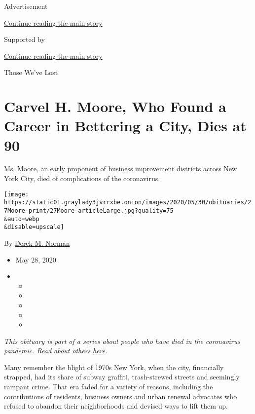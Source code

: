 Advertisement

\protect\hyperlink{after-top}{Continue reading the main story}

Supported by

\protect\hyperlink{after-sponsor}{Continue reading the main story}

Those We've Lost

\hypertarget{carvel-h-moore-who-found-a-career-in-bettering-a-city-dies-at-90}{%
\section{Carvel H. Moore, Who Found a Career in Bettering a City, Dies
at
90}\label{carvel-h-moore-who-found-a-career-in-bettering-a-city-dies-at-90}}

Ms. Moore, an early proponent of business improvement districts across
New York City, died of complications of the coronavirus.

\texttt{[image: https://static01.graylady3jvrrxbe.onion/images/2020/05/30/obituaries/27Moore-print/27Moore-articleLarge.jpg?quality=75\\\&auto=webp\\\&disable=upscale]}

By \href{https://www.nytimes3xbfgragh.onion/by/derek-m-norman}{Derek M.
Norman}

\begin{itemize}
\item
  May 28, 2020
\item
  \begin{itemize}
  \item
  \item
  \item
  \item
  \item
  \end{itemize}
\end{itemize}

\emph{This obituary is part of a series about people who have died in
the coronavirus pandemic. Read about others}
\href{https://www.nytimes3xbfgragh.onion/interactive/2020/obituaries/people-died-coronavirus-obituaries.html}{\emph{here}}\emph{.}

Many remember the blight of 1970s New York, when the city, financially
strapped, had its share of subway graffiti, trash-strewed streets and
seemingly rampant crime. That era faded for a variety of reasons,
including the contributions of residents, business owners and urban
renewal advocates who refused to abandon their neighborhoods and devised
ways to lift them up.

